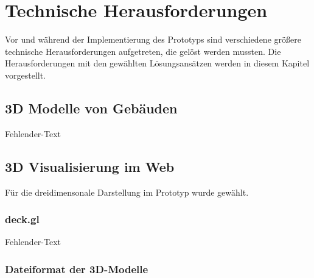 \newpage
\section{Technische Herausforderungen}
Vor und während der Implementierung des Prototyps sind verschiedene größere technische Herausforderungen aufgetreten, die gelöst werden mussten. Die Herausforderungen mit den gewählten Lösungsansätzen werden in diesem Kapitel vorgestellt. 

\subsection{3D Modelle von Gebäuden}
Fehlender-Text

\subsection{3D Visualisierung im Web}
Für die dreidimensonale Darstellung im Prototyp wurde \deckgl{} gewählt.

\subsubsection{deck.gl}
Fehlender-Text

\subsubsection{Dateiformat der 3D-Modelle}\label{sec:ModelFileFormat}

